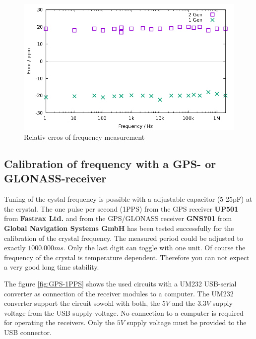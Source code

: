 \begin{figure}[H]
\centering
\includegraphics[width=18cm]{../GNU/frequency-ppm.pdf}
\caption{Relativ erros of frequency measurement}
\label{fig:freq-ppm}
\end{figure}

\subsection{Calibration of frequency with a GPS- or GLONASS-receiver}

Tuning of the cystal frequency is possible with a adjustable capacitor (5-25pF) at the crystal.
The one pulse per second (1PPS) from the GPS receiver {\bf UP501} from {\bf Fastrax Ltd.} and from the GPS/GLONASS receiver
{\bf GNS701} from {\bf Global Navigation Systems GmbH} has been tested successfully for the calibration of the
crystal frequency.
The measured period could be adjusted to exactly \(1000.000ms\).
Only the last digit can toggle with one unit.
Of course the frequency of the crystal is temperature dependent.
Therefore you can not expect a very good long time stability.

The figure \ref{fig:GPS-1PPS} shows the used circuits with a UM232 USB-serial converter
as connection of the receiver modules to a computer.
The UM232 converter support the circuit sowohl with both, the \(5V\) and the \(3.3V\) supply voltage
from the USB supply voltage.
No connection to a computer is required for operating the receivers.
Only the \(5V\) supply voltage must be provided to the USB connector.

